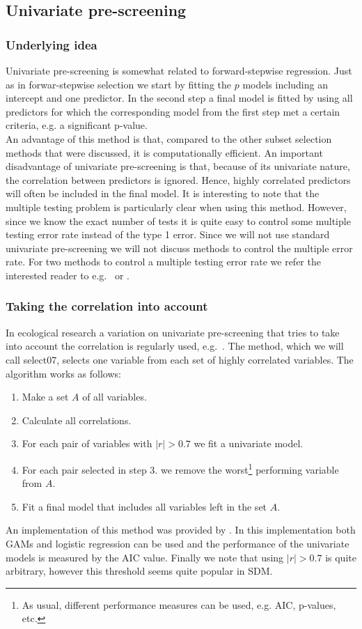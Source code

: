 \subsection{Univariate pre-screening}
\subsubsection{Underlying idea}
Univariate pre-screening is somewhat related to forward-stepwise regression. Just as in forwar-stepwise selection we start by fitting the $p$ models including an intercept and one predictor. In the second step a final model is fitted by using all predictors for which the corresponding model from the first step met a certain criteria, e.g. a significant p-value. \\

An advantage of this method is that, compared to the other subset selection methods that were discussed, it is computationally efficient. 
An important disadvantage of univariate pre-screening is that, because of its univariate nature, the correlation between predictors is ignored. Hence, highly correlated predictors will often be included in the final model. It is interesting to note that the multiple testing problem is particularly clear when using this method. However, since we know the exact number of tests it is quite easy to control some multiple testing error rate instead of the type 1 error. Since we will not use standard univariate pre-screening we will not discuss methods to control the multiple error rate. For two methods to control a multiple testing error rate we refer the interested reader to e.g.\ \cite{holm_simple_1979} or \cite{benjamini_controlling_1995}.

\subsubsection{Taking the correlation into account}
In ecological research a variation on univariate pre-screening that tries to take into account the correlation is regularly used, e.g.\ \cite{cord_remote_2014}. The method, which we will call select07, selects one variable from each set of highly correlated variables. The algorithm works as follows:
\begin{enumerate}
\item Make a set $A$ of all variables.
\item Calculate all correlations.
\item For each pair of variables with $|r| > 0.7$ we fit a univariate model.
\item For each pair selected in step 3. we remove the worst\footnote{As usual, different performance measures can be used, e.g. AIC, p-values, etc.} performing variable from $A$.
\item Fit a final model that includes all variables left in the set $A$.
\end{enumerate}
An implementation of this method was provided by \cite{dormann_collinearity:_2013}. In this implementation both GAMs and logistic regression can be used and the performance of the univariate models is measured by the AIC value. Finally we note that using $|r| > 0.7$ is quite arbitrary, however this threshold seems quite popular in SDM.

